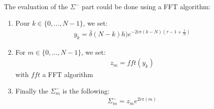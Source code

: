 The evaluation of the $\Sigma^{-}$ part could be done using a FFT algorithm:
\begin{enumerate}
\item Pour $k\in\{0,\hdots,N-1\}$, we set:
\begin{align}
y_{k}= \bar{\delta}(N-k)h)e^{-2i\pi (k-N)\left(\tau-1+\frac{1}{N}\right)}
\end{align}
\item For $m \in\{0,\hdots,N-1\}$, we set:
\begin{align}
  z_{m}=fft(y_{k})
\end{align}
with $fft$ a FFT algorithm
\item Finally the $\Sigma_{m}^{-}$ is the following:
\begin{align*}
  \Sigma_{m}^{-}=z_{m}e^{2i\pi\left(m\right)}
\end{align*}
\end{enumerate}

